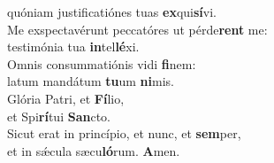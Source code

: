 \evenverse quóniam justificatiónes tuas \textbf{ex}qui\textbf{sí}vi.\\
\oddverse Me exspectavérunt peccatóres ut pérde\textbf{rent} me:~\*\\
\oddverse testimónia tua \textbf{in}tel\textbf{lé}xi.\\
\evenverse Omnis consummatiónis vidi \textbf{fi}nem:~\*\\
\evenverse latum mandátum \textbf{tu}um \textbf{ni}mis.\\
\oddverse Glória Patri, et \textbf{Fí}lio,~\*\\
\oddverse et Spi\textbf{rí}tui \textbf{San}cto.\\
\evenverse Sicut erat in princípio, et nunc, et \textbf{sem}per,~\*\\
\evenverse et in sǽcula sæcu\textbf{ló}rum. \textbf{A}men.\\
